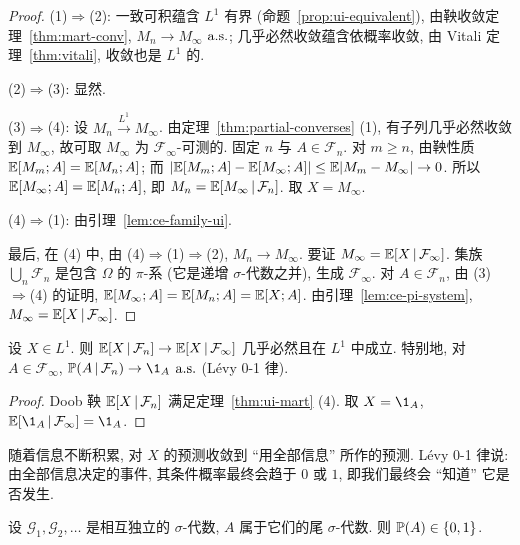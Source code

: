 \begin{proof}
(1)$\Rightarrow$(2): 一致可积蕴含 $L^1$ 有界 (命题~\ref{prop:ui-equivalent}), 由鞅收敛定理~\ref{thm:mart-conv}, $M_n\to M_\infty$ $\as$; 几乎必然收敛蕴含依概率收敛, 由 Vitali 定理~\ref{thm:vitali}, 收敛也是 $L^1$ 的.

(2)$\Rightarrow$(3): 显然.

(3)$\Rightarrow$(4): 设 $M_n\xrightarrow{L^1}M_\infty$. 由定理~\ref{thm:partial-converses} (1), 有子列几乎必然收敛到 $M_\infty$, 故可取 $M_\infty$ 为 $\mathcal{F}_\infty$-可测的. 固定 $n$ 与 $A\in\mathcal{F}_n$. 对 $m\ge n$, 由鞅性质 $\E[M_m;A]=\E[M_n;A]$; 而 $\abs{\E[M_m;A]-\E[M_\infty;A]}\le\E\abs{M_m-M_\infty}\to0$. 所以 $\E[M_\infty;A]=\E[M_n;A]$, 即 $M_n=\E[M_\infty\,|\,\mathcal{F}_n]$. 取 $X=M_\infty$.

(4)$\Rightarrow$(1): 由引理~\ref{lem:ce-family-ui}.

最后, 在 (4) 中, 由 (4)$\Rightarrow$(1)$\Rightarrow$(2), $M_n\to M_\infty$. 要证 $M_\infty=\E[X\,|\,\mathcal{F}_\infty]$. 集族 $\bigcup_n\mathcal{F}_n$ 是包含 $\Omega$ 的 $\pi$-系 (它是递增 $\sigma$-代数之并), 生成 $\mathcal{F}_\infty$. 对 $A\in\mathcal{F}_n$, 由 (3)$\Rightarrow$(4) 的证明, $\E[M_\infty;A]=\E[M_n;A]=\E[X;A]$. 由引理~\ref{lem:ce-pi-system}, $M_\infty=\E[X\,|\,\mathcal{F}_\infty]$.
\end{proof}

\begin{corollary}\label{cor:levy-up}
设 $X\in L^1$. 则 $\E[X\,|\,\mathcal{F}_n]\to\E[X\,|\,\mathcal{F}_\infty]$ 几乎必然且在 $L^1$ 中成立. 特别地, 对 $A\in\mathcal{F}_\infty$, $\P(A\,|\,\mathcal{F}_n)\to\1_A$ $\as$ (L\'evy 0-1 律).
\end{corollary}

\begin{proof}
Doob 鞅 $\E[X\,|\,\mathcal{F}_n]$ 满足定理~\ref{thm:ui-mart} (4). 取 $X=\1_A$, $\E[\1_A\,|\,\mathcal{F}_\infty]=\1_A$.
\end{proof}

\begin{intuition}
随着信息不断积累, 对 $X$ 的预测收敛到 ``用全部信息'' 所作的预测. L\'evy 0-1 律说: 由全部信息决定的事件, 其条件概率最终会趋于 $0$ 或 $1$, 即我们最终会 ``知道'' 它是否发生.
\end{intuition}

\begin{corollary}\label{cor:kolmogorov-01-martingale}
设 $\mathcal{G}_1,\mathcal{G}_2,\dots$ 是相互独立的 $\sigma$-代数, $A$ 属于它们的尾 $\sigma$-代数. 则 $\P(A)\in\{0,1\}$.
\end{corollary}

